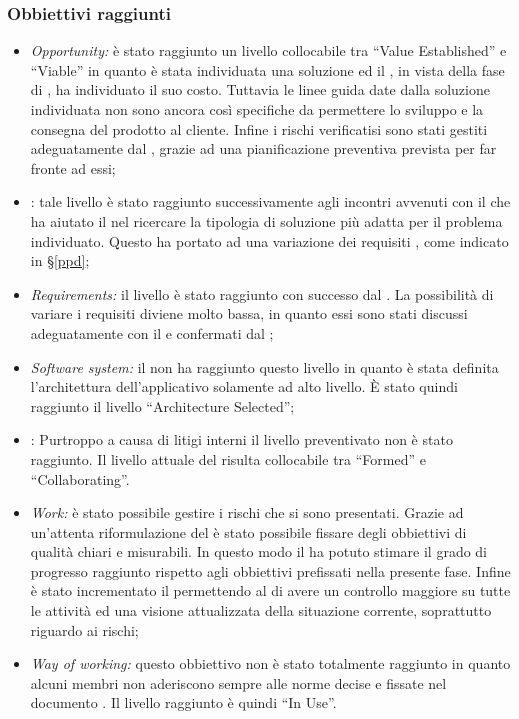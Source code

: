 \subsubsection{Obbiettivi raggiunti}
\begin{itemize}
\item \textit{Opportunity:} è stato raggiunto un livello collocabile tra ``Value Established'' e ``Viable'' in quanto è stata individuata una soluzione ed il , in vista della fase di \fC, ha individuato il suo costo. Tuttavia le linee guida date dalla soluzione individuata non sono ancora così specifiche da permettere lo sviluppo e la consegna del prodotto al cliente. Infine i rischi verificatisi sono stati gestiti adeguatamente dal , grazie ad una pianificazione preventiva prevista per far fronte ad essi;
\item {}: tale livello è stato raggiunto successivamente agli incontri avvenuti con il  che ha aiutato il  nel ricercare la tipologia di soluzione più adatta per il problema individuato. Questo ha portato ad una variazione dei requisiti , come indicato in §\ref{ppd};
\item \textit{Requirements:} il livello è stato raggiunto con successo dal . La possibilità di variare i requisiti diviene molto bassa, in quanto essi sono stati discussi adeguatamente con il  e confermati dal ;
\item \textit{Software system:} il  non ha raggiunto questo livello in quanto è stata definita l'architettura dell'applicativo solamente ad alto livello. \`E stato quindi raggiunto il livello ``Architecture Selected'';
\item {}: Purtroppo a causa di litigi interni il livello preventivato non è stato raggiunto. Il livello attuale del  risulta collocabile tra ``Formed'' e ``Collaborating''.
\item \textit{Work:} è stato possibile gestire i rischi che si sono presentati. Grazie ad un'attenta riformulazione del \PQ è stato possibile fissare degli obbiettivi di qualità chiari e misurabili. In questo modo il  ha potuto stimare il grado di progresso raggiunto rispetto agli obbiettivi prefissati nella presente fase. Infine è stato incrementato il \PP permettendo al \rRP di avere un controllo maggiore su tutte le attività ed una visione attualizzata della situazione corrente, soprattutto riguardo ai rischi;
\item \textit{Way of working:} questo obbiettivo non è stato totalmente raggiunto in quanto alcuni membri non aderiscono sempre alle norme decise e fissate nel documento \NP. Il livello raggiunto è quindi ``In Use''.
\end{itemize}
